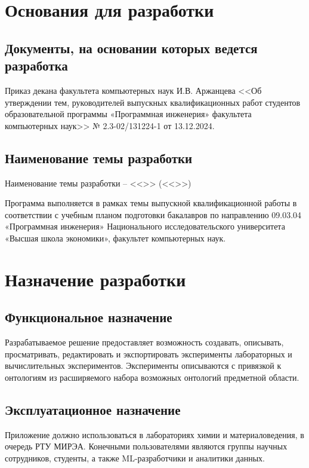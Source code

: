 \documentclass[a4paper,12pt,reqno]{article}
\begin{document}
    \section{Основания для разработки}

    \subsection{Документы, на основании которых ведется разработка}
    Приказ декана факультета компьютерных наук И.В. Аржанцева <<Об утверждении тем, руководителей выпускных квалификационных работ студентов образовательной программы «Программная инженерия» факультета компьютерных наук>> № 2.3-02/131224-1 от 13.12.2024.

    \subsection{Наименование темы разработки}
    Наименование темы разработки – <<\unskip>> (<<\unskip>>)

    Программа выполняется в рамках темы выпускной квалификационной работы в соответствии с учебным планом подготовки бакалавров по направлению 09.03.04 «Программная инженерия» Национального исследовательского университета «Высшая школа экономики», факультет компьютерных наук.
    \newpage


    \section{Назначение разработки}

    \subsection{Функциональное назначение}
    Разрабатываемое решение предоставляет возможность создавать, описывать, просматривать, редактировать и экспортировать эксперименты лабораторных и вычислительных экспериментов. Эксперименты описываются с привязкой к онтологиям из расширяемого набора возможных онтологий предметной области.

    \subsection{Эксплуатационное назначение}
    Приложение должно использоваться в лабораториях химии и материаловедения, в очередь РТУ МИРЭА. Конечными пользователями являются группы научных сотрудников, студенты, а также ML-разработчики и аналитики данных.
    \newpage
\end{document}
